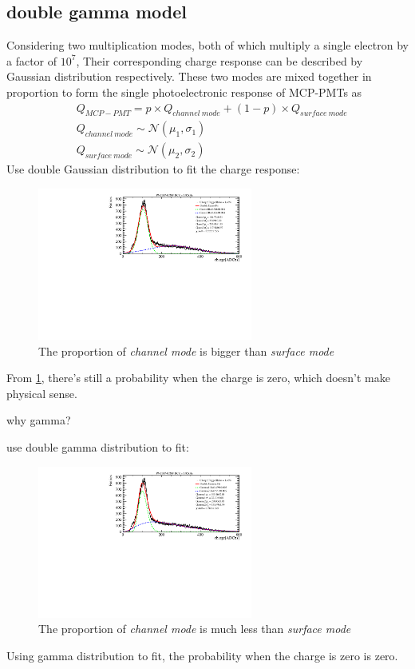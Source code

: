 \documentclass{article}
\begin{document}
\subsection{double gamma model}\label{subsec:doublegamma}
Considering two multiplication modes, both of which multiply a single electron by a factor of $10^7$, 
Their corresponding charge response can be described by Gaussian distribution respectively. 
These two modes are mixed together in proportion to form the single photoelectronic response of MCP-PMTs as 
\begin{equation}
    \label{eq:doublegaus}
    \begin{aligned}
        & Q_{MCP-PMT} = p\times Q_{channel\  mode} + (1-p)\times Q_{surface\  mode} \\
        & Q_{channel\  mode} \sim \mathcal{N} (\mu_1, \sigma_1) \\
        & Q_{surface\  mode} \sim \mathcal{N} (\mu_2, \sigma_2)
    \end{aligned}
\end{equation}
Use double Gaussian distribution to fit the charge response:
\begin{figure}[ht]
    \centering
    \includegraphics[height=5cm]{pic/doubleGauss.pdf}
    \caption{The proportion of \textit{channel mode} is bigger than \textit{surface mode}}\label{fig:doubleGauss}
\end{figure}

From \ref{fig:doubleGauss}, there's still a probability when the charge is zero, which doesn't make physical sense.

why gamma?

use double gamma distribution to fit:
\begin{figure}[ht]
    \centering
    \includegraphics[height=5cm]{pic/doubleGamma.pdf}
    \caption{The proportion of \textit{channel mode} is much less than \textit{surface mode}}\label{fig:doubleGamma}
\end{figure}
Using gamma distribution to fit, the probability when the charge is zero is zero.
\end{document}
